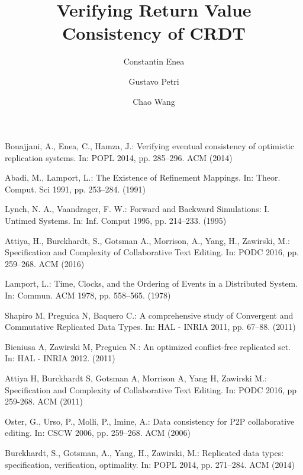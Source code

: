 \documentclass{llncs}
\title{Verifying Return Value Consistency of CRDT}
\author {Constantin Enea \and Gustavo Petri \and Chao Wang}
\institute{Institut de Recherche en Informatique Fondamentale, \\Univ. Paris Diderot (Paris 7)
}
\begin{document}
\maketitle















%



%  
%
%


\begin{thebibliography}{50}
Bouajjani, A., Enea, C., Hamza, J.:
\newblock Verifying eventual consistency of optimistic replication systems.
\newblock In: POPL 2014, pp. 285--296. ACM (2014)


Abadi, M., Lamport, L.:
\newblock The Existence of Refinement Mappings.
\newblock In: Theor. Comput. Sci 1991, pp. 253--284.  (1991)


Lynch, N. A., Vaandrager, F. W.:
\newblock Forward and Backward Simulations: I. Untimed Systems.
\newblock In: Inf. Comput 1995, pp. 214--233.  (1995)


Attiya, H., Burckhardt, S., Gotsman A., Morrison, A., Yang, H., Zawirski, M.:
\newblock Specification and Complexity of Collaborative Text Editing.
\newblock In: PODC 2016, pp. 259--268. ACM (2016)


Lamport, L.:
\newblock Time, Clocks, and the Ordering of Events in a Distributed System.
\newblock In: Commun. ACM 1978, pp. 558--565. (1978)


Shapiro M, Preguica N, Baquero C.:
\newblock A comprehensive study of Convergent and Commutative Replicated Data Types.
\newblock In: HAL - INRIA 2011, pp. 67--88. (2011)


Bieniusa A, Zawirski M, Preguica N.:
\newblock An optimized conflict-free replicated set.
\newblock In: HAL - INRIA 2012. (2011)


Attiya H, Burckhardt S, Gotsman A, Morrison A, Yang H, Zawirski M.:
\newblock Specification and Complexity of Collaborative Text Editing.
\newblock In: PODC 2016, pp 259-268. ACM (2011)

Oster, G., Urso, P., Molli, P., Imine, A.:
\newblock Data consistency for P2P collaborative editing.
\newblock In: CSCW 2006, pp. 259--268. ACM (2006)

Burckhardt, S., Gotsman, A., Yang, H., Zawirski, M.:
\newblock Replicated data types: specification, verification, optimality.
\newblock In: POPL 2014, pp. 271--284. ACM (2014)
\end{thebibliography}
\newpage

\appendix


\end{document}
